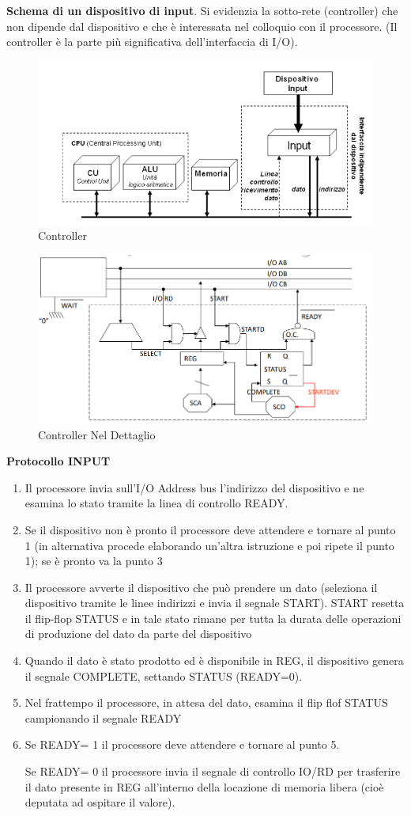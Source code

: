\documentclass[12pt]{article}
\begin{document}
\textbf{Schema di un dispositivo di input}. Si evidenzia la sotto-rete (controller) che non
dipende dal dispositivo e che è interessata nel colloquio con il processore. (Il controller è la parte più significativa dell’interfaccia di I/O).
\begin{figure}[h]
    \centering
    \includegraphics[width=0.50\linewidth]{input.png}
    \caption{Controller}
    \label{fig:enter-label}
\end{figure}
\begin{figure}[t]
    \centering
    \includegraphics[width=1\linewidth]{controller.png}
    \caption{Controller Nel Dettaglio}
    \label{fig:enter-label}
\end{figure}
\newpage
\textbf{Protocollo INPUT}
\begin{enumerate}
    \item  Il processore invia sull’I/O Address bus l’indirizzo del dispositivo e ne esamina lo stato tramite la linea di controllo READY.
    \item Se il dispositivo non è pronto il processore deve attendere e tornare al punto 1 (in alternativa procede elaborando un’altra istruzione e poi ripete il punto 1); se è pronto va la punto 3
    \item Il processore avverte il dispositivo che può prendere un dato (seleziona il dispositivo tramite le linee indirizzi e invia il segnale START). START resetta il flip-flop STATUS e in tale stato rimane per tutta la durata delle operazioni di produzione del dato da parte del dispositivo
    \item Quando il dato è stato prodotto ed è disponibile in REG, il dispositivo genera il segnale COMPLETE, settando STATUS (READY=0).
    \item Nel frattempo il processore, in attesa del dato, esamina il flip flof STATUS campionando il segnale READY
    \item Se READY= 1 il processore deve attendere e tornare al punto 5.
    \par\medskip\noindent Se READY= 0 il processore invia il segnale di controllo IO/RD per trasferire il dato presente in REG all’interno della locazione di memoria libera (cioè deputata ad ospitare il valore).
\end{enumerate}
\end{document}
